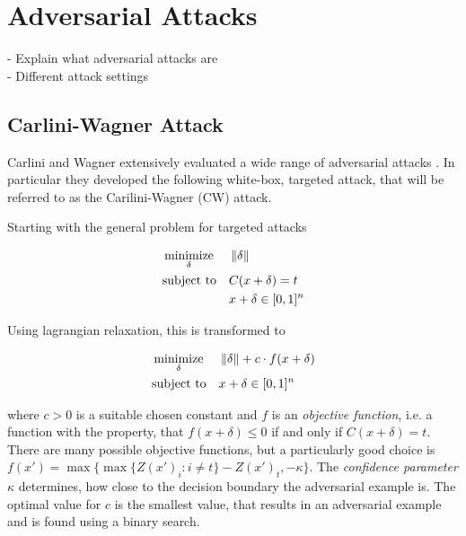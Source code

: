 
\newcommand{\norm}[1]{\left \lVert #1 \right \rVert}

\section{Adversarial Attacks}
- Explain what adversarial attacks are \\
- Different attack settings

\subsection{Carlini-Wagner Attack}

Carlini and Wagner extensively evaluated a wide range of adversarial attacks \cite{carlini}.
In particular they developed the following white-box, targeted attack, that will be referred to as the Carilini-Wagner (CW) attack.

Starting with the general problem for targeted attacks

\begin{equation}
\begin{aligned}
& \minimize_{\delta} && \norm{\delta} \\
& \text{subject to} && C(x + \delta) = t \\
& && x + \delta \in [0,1]^n
\end{aligned}
\end{equation}

Using lagrangian relaxation, this is transformed to

\begin{equation}
\begin{aligned}
& \minimize_{\delta} && \norm{\delta} + c \cdot f(x + \delta)\\
& \text{subject to} && x + \delta \in [0,1]^n
\end{aligned}
\end{equation}

where $c > 0$ is a suitable chosen constant and $f$ is an \emph{objective function}, i.e. a function with the property, that
$f(x + \delta) \leq 0$ if and only if $C(x + \delta) = t$.
There are many possible objective functions, but a particularly good choice is
$f(x') = \max \{ \max \{Z(x')_i : i \neq t \} - Z(x')_t, -\kappa \}$.
The \emph{confidence parameter} $\kappa$ determines, how close to the decision boundary the adversarial example is.
The optimal value for $c$ is the smallest value, that results in an adversarial example and is found using a binary search.


